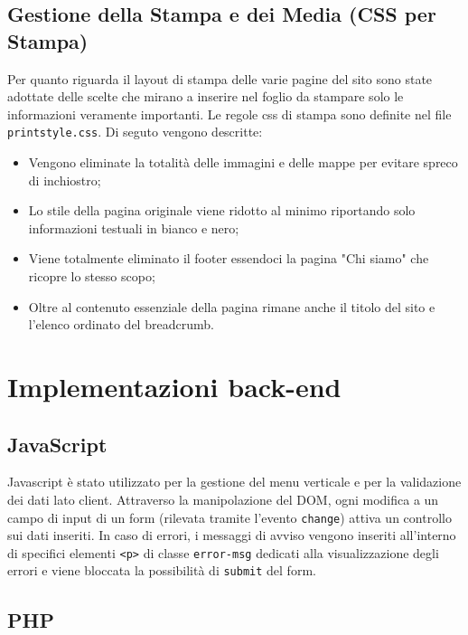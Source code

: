 \documentclass{article}
\begin{document}
\subsection{Gestione della Stampa e dei Media (CSS per Stampa)}
Per quanto riguarda il layout di stampa delle varie pagine del sito sono state adottate delle scelte che mirano a inserire nel foglio da stampare solo le informazioni veramente importanti. Le regole css di stampa sono definite nel file \texttt{printstyle.css}. Di seguto vengono descritte:
\begin{itemize}
    \item Vengono eliminate la totalità delle immagini e delle mappe per evitare spreco di inchiostro;
    \item Lo stile della pagina originale viene ridotto al minimo riportando solo informazioni testuali in bianco e nero;
    \item Viene totalmente eliminato il footer essendoci la pagina "Chi siamo" che ricopre lo stesso scopo;
    \item Oltre al contenuto essenziale della pagina rimane anche il titolo del sito e l'elenco ordinato del breadcrumb.
\end{itemize}

\newpage


\section{Implementazioni back-end}



\subsection{JavaScript}

Javascript è stato utilizzato per la gestione del menu verticale e per la validazione dei dati lato client.
Attraverso la manipolazione del DOM, ogni modifica a un campo di input di un form (rilevata tramite l'evento \texttt{change}) attiva un controllo sui dati inseriti.
In caso di errori, i messaggi di avviso vengono inseriti all'interno di specifici elementi \texttt{<p>} di classe \texttt{error-msg} dedicati alla visualizzazione degli errori e viene bloccata la possibilità di \texttt{submit} del form.

\subsection{PHP}
\end{document}
